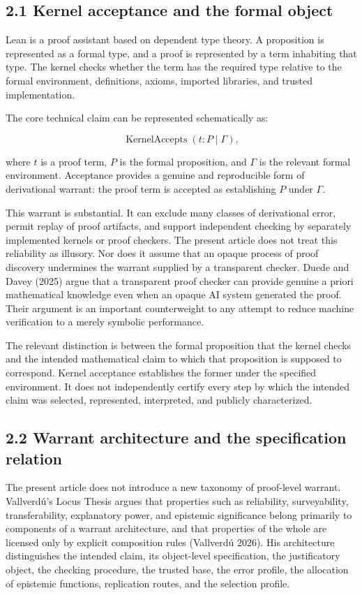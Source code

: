 \documentclass[sn-apa]{sn-jnl}
\begin{document}
\subsection{2.1 Kernel acceptance and the formal object}

Lean is a proof assistant based on dependent type theory. A proposition is represented as a formal type, and a proof is represented by a term inhabiting that type. The kernel checks whether the term has the required type relative to the formal environment, definitions, axioms, imported libraries, and trusted implementation.

The core technical claim can be represented schematically as:

\[
\operatorname{KernelAccepts}(t : P \mid \Gamma),
\]


where \(t\) is a proof term, \(P\) is the formal proposition, and \(\Gamma\) is the relevant formal environment. Acceptance provides a genuine and reproducible form of derivational warrant: the proof term is accepted as establishing \(P\) under \(\Gamma\).

This warrant is substantial. It can exclude many classes of derivational error, permit replay of proof artifacts, and support independent checking by separately implemented kernels or proof checkers. The present article does not treat this reliability as illusory. Nor does it assume that an opaque process of proof discovery undermines the warrant supplied by a transparent checker. Duede and Davey (2025) argue that a transparent proof checker can provide genuine a priori mathematical knowledge even when an opaque AI system generated the proof. Their argument is an important counterweight to any attempt to reduce machine verification to a merely symbolic performance.

The relevant distinction is between the formal proposition that the kernel checks and the intended mathematical claim to which that proposition is supposed to correspond. Kernel acceptance establishes the former under the specified environment. It does not independently certify every step by which the intended claim was selected, represented, interpreted, and publicly characterized.

\subsection{2.2 Warrant architecture and the specification relation}

The present article does not introduce a new taxonomy of proof-level warrant. Vallverdú’s Locus Thesis argues that properties such as reliability, surveyability, transferability, explanatory power, and epistemic significance belong primarily to components of a warrant architecture, and that properties of the whole are licensed only by explicit composition rules (Vallverdú 2026). His architecture distinguishes the intended claim, its object-level specification, the justificatory object, the checking procedure, the trusted base, the error profile, the allocation of epistemic functions, replication routes, and the selection profile.
\end{document}

